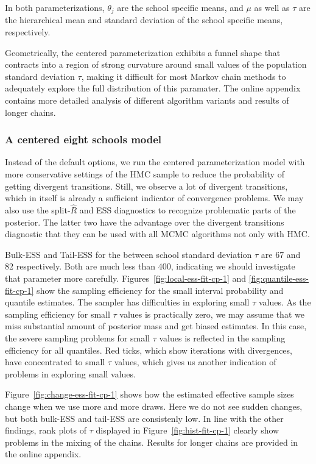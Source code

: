 \documentclass[american,]{article}
\begin{document}
In both parameterizations, $\theta_j$ are the school specific means,
and $\mu$ as well as $\tau$ are the hierarchical mean and standard deviation 
of the school specific means, respectively.

Geometrically, the centered parameterization exhibits a funnel shape
that contracts into a region of strong curvature around small
values of the population standard deviation $\tau$, making it difficult for most
Markov chain methods to adequately explore the full distribution of this
paramater. The online appendix contains more detailed analysis of different 
algorithm variants and results of longer chains.

\hypertarget{a-centered-eight-schools-model}{%
\subsubsection*{A centered eight schools
model}\label{a-centered-eight-schools-model}}

Instead of the default options, we run the centered parameterization
model with more conservative settings of the HMC sample to reduce the
probability of getting divergent transitions. Still, we observe a lot of divergent
transitions, which in itself is already a sufficient indicator of
convergence problems. We may also use the split-\(\widehat{R}\) and ESS
diagnostics to recognize problematic parts of the posterior. The latter
two have the advantage over the divergent transitions diagnostic that they
can be used with all MCMC algorithms not only with HMC.

Bulk-ESS and Tail-ESS for the between school standard deviation $\tau$
are 67 and 82 respectively. Both are much less than 400, indicating we
should investigate that parameter more carefully.
Figures~\ref{fig:local-ess-fit-cp-1} and
\ref{fig:quantile-ess-fit-cp-1} show the sampling efficiency for the
small interval probability and quantile estimates.
The sampler has difficulties in exploring small $\tau$ values. As the
sampling efficiency for small $\tau$ values is practically zero, we
may assume that we miss substantial amount of posterior mass and
get biased estimates. In this case, the severe sampling problems for
small $\tau$ values is reflected in the sampling efficiency for all
quantiles. Red ticks, which show iterations with divergences, have
concentrated to small $\tau$ values, which gives us another indication
of problems in exploring small values.

Figure~\ref{fig:change-ess-fit-cp-1} shows how the estimated effective
sample sizes change when we use more and more draws. Here we do not
see sudden changes, but both bulk-ESS and tail-ESS are consistenly low. 
In line with the other findings, rank plots of $\tau$ displayed in
Figure~\ref{fig:hist-fit-cp-1} clearly show problems in the mixing of
the chains. Results for longer chains are provided in the online appendix.
\end{document}
